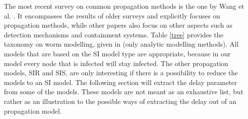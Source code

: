 The most recent survey on common propagation methods is the one by Wang et al. \citep{wang2014modeling}. It encompasses the results of older surveys and explicitly focuses on propagation methods, while other papers also focus on other aspects such as  detection mechanisms and containment systems.
Table \ref{tree} provides the taxonomy on worm modelling, given in \citep{wang2014modeling} (only analytic modelling methods).
 All models that are based on the SI model type are appropriate, because in our model every node that is infected will stay infected. The other propagation models, SIR and SIS, are only interesting if there is a possibility to reduce the models to an SI model. The following section will extract the delay parameter from some of the models. These models are not meant as an exhaustive list, but rather as an illustration to the possible ways of extracting the delay out of an propagation model. 










